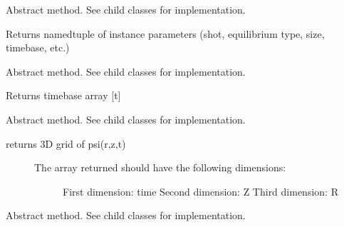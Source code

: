 \documentclass[letterpaper,10pt,english]{sphinxmanual}
\begin{document}
\begin{fulllineitems}
\begin{fulllineitems}
\begin{quote}
\begin{description}
\end{description}\end{quote}

\end{fulllineitems}


\begin{fulllineitems}
\label{eqtools:eqtools.core.Equilibrium.getInfo}
Abstract method.  See child classes for implementation.

Returns namedtuple of instance parameters (shot, equilibrium type, size, timebase, etc.)

\end{fulllineitems}


\begin{fulllineitems}
\label{eqtools:eqtools.core.Equilibrium.getTimeBase}
Abstract method.  See child classes for implementation.

Returns timebase array {[}t{]}

\end{fulllineitems}


\begin{fulllineitems}
\label{eqtools:eqtools.core.Equilibrium.getFluxGrid}
Abstract method.  See child classes for implementation.
\begin{description}
\item[{returns 3D grid of psi(r,z,t)}] \leavevmode\begin{description}
\item[{The array returned should have the following dimensions:}] \leavevmode
First dimension: time
Second dimension: Z
Third dimension: R

\end{description}

\end{description}

\end{fulllineitems}


\begin{fulllineitems}
\label{eqtools:eqtools.core.Equilibrium.getRGrid}
Abstract method.  See child classes for implementation.


\end{fulllineitems}
\end{fulllineitems}
\end{document}
